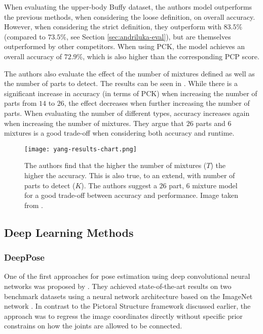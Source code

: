 When evaluating the upper-body Buffy dataset, the authors model outperforms the previous methods, when considering the loose definition, on overall accuracy.
However, when considering the strict definition, they outperform \cite{andriluka_pictorial_2009} with $83.5\%$ (compared to $73.5\%$, see Section \ref{sec:andriluka-eval}), but are themselves outperformed by other competitors.
When using PCK, the model achieves an overall accuracy of $72.9\%$, which is also higher than the corresponding PCP score.

The authors also evaluate the effect of the number of mixtures defined as well as the number of parts to detect.
The results can be seen in .
While there is a significant increase in accuracy (in terms of PCK) when increasing the number of parts from $14$ to $26$, the effect decreases when further increasing the number of parts.
When evaluating the number of different types, accuracy increases again when increasing the number of mixtures.
They argue that $26$ parts and $6$ mixtures is a good trade-off when considering both accuracy and runtime.  

\begin{figure}[htb!]
    \centering
    \texttt{[image: yang-results-chart.png]}
    \caption{The authors find that the higher the number of mixtures ($T$) the higher the accuracy. This is also true, to an extend, with number of parts to detect ($K$). The authors suggest a $26$ part, $6$ mixture model for a good trade-off between accuracy and performance. Image taken from \cite{yang_articulated_2011}.}
    \label{fig:yang-results-chart}
\end{figure}

\subsection{Deep Learning Methods}

\subsubsection{DeepPose}
\label{sec:deeppose}

One of the first approaches for pose estimation using deep convolutional neural networks was proposed by \cite{toshev_deeppose:_2014}.
They achieved state-of-the-art results on two benchmark datasets using a neural network architecture based on the ImageNet network \cite{krizhevsky_imagenet_2012}.
In contrast to the Pictoral Structure framework discussed earlier, the approach was to regress the image coordinates directly without specific prior constrains on how the joints are allowed to be connected.

